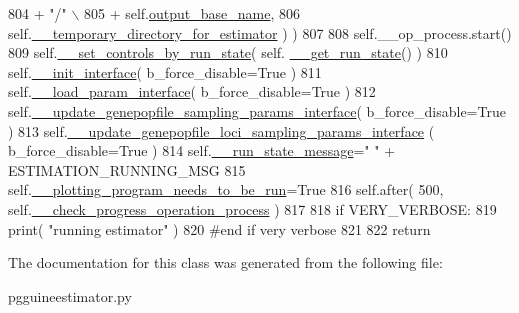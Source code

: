 \begin{DoxyCode}
804                                     + \textcolor{stringliteral}{"/"} \(\backslash\)
805                                     + self.\hyperlink{classnegui_1_1pgguineestimator_1_1PGGuiNeEstimator_a06cd70f99cee79ebf3a4efb9a17880e9}{output\_base\_name},
806                             self.\hyperlink{classnegui_1_1pgguineestimator_1_1PGGuiNeEstimator_ac0451bb2cf56f46b6f01c9cf621f267f}{\_\_temporary\_directory\_for\_estimator} ) )
807 
808         self.\_\_op\_process.start()
809         self.\hyperlink{classnegui_1_1pgguineestimator_1_1PGGuiNeEstimator_a642c1843660f735af5c340288b87ba77}{\_\_set\_controls\_by\_run\_state}( self.
      \hyperlink{classnegui_1_1pgguineestimator_1_1PGGuiNeEstimator_a364cae23d8c50e52b0fb58d97ff88a80}{\_\_get\_run\_state}() )
810         self.\hyperlink{classnegui_1_1pgguineestimator_1_1PGGuiNeEstimator_a9bcfb565358347c231ba954a4ff8a5eb}{\_\_init\_interface}( b\_force\_disable=\textcolor{keyword}{True} )
811         self.\hyperlink{classnegui_1_1pgguineestimator_1_1PGGuiNeEstimator_a7194ba410abd1cbedf41ca116ca87b3c}{\_\_load\_param\_interface}( b\_force\_disable=\textcolor{keyword}{True} )
812         self.\hyperlink{classnegui_1_1pgguineestimator_1_1PGGuiNeEstimator_a7be1aa7e8f51033c9e08069f9904e18c}{\_\_update\_genepopfile\_sampling\_params\_interface}( 
      b\_force\_disable=\textcolor{keyword}{True} )
813         self.\hyperlink{classnegui_1_1pgguineestimator_1_1PGGuiNeEstimator_a205552d4f4155ae058e0f7265de7963f}{\_\_update\_genepopfile\_loci\_sampling\_params\_interface}
      ( b\_force\_disable=\textcolor{keyword}{True} )
814         self.\hyperlink{classnegui_1_1pgguineestimator_1_1PGGuiNeEstimator_ae6a16b7c4d38875158d845896d6be3cc}{\_\_run\_state\_message}=\textcolor{stringliteral}{"  "} + ESTIMATION\_RUNNING\_MSG
815         self.\hyperlink{classnegui_1_1pgguineestimator_1_1PGGuiNeEstimator_add9f89eba5935d4ff5af7ddbe59ecb7f}{\_\_plotting\_program\_needs\_to\_be\_run}=\textcolor{keyword}{True} 
816         self.after( 500, self.\hyperlink{classnegui_1_1pgguineestimator_1_1PGGuiNeEstimator_a9c84253ae2241c86a0cca6594c430de0}{\_\_check\_progress\_operation\_process} )
817 
818         \textcolor{keywordflow}{if} VERY\_VERBOSE:
819             print( \textcolor{stringliteral}{"running estimator"} )
820         \textcolor{comment}{#end if very verbose}
821 
822         \textcolor{keywordflow}{return}
\end{DoxyCode}


The documentation for this class was generated from the following file\+:\begin{DoxyCompactItemize}
\item 
pgguineestimator.\+py\end{DoxyCompactItemize}
